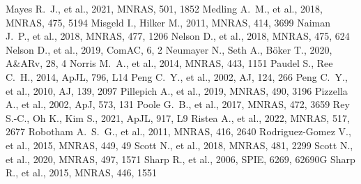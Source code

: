 \documentclass[a4paper,fleqn,usenatbib]{mnras}
\begin{document}
\begin{thebibliography}{99}
 Mayes R.~J., et al., 2021, MNRAS, 501, 1852
 Medling A.~M., et al., 2018, MNRAS, 475, 5194
 Misgeld I., Hilker M., 2011, MNRAS, 414, 3699
 Naiman J.~P., et al., 2018, MNRAS, 477, 1206
 Nelson D., et al., 2018, MNRAS, 475, 624
 Nelson D., et al., 2019, ComAC, 6, 2
 Neumayer N., Seth A., B{\"o}ker T., 2020, A\&ARv, 28, 4
 Norris M.~A., et al., 2014, MNRAS, 443, 1151
 Paudel S., Ree C.~H., 2014, ApJL, 796, L14
 Peng C.~Y., et al., 2002, AJ, 124, 266
   Peng C.~Y., et al., 2010, AJ, 139, 2097
 Pillepich A., et al., 2019, MNRAS, 490, 3196
 Pizzella A., et al., 2002, ApJ, 573, 131
 Poole G.~B., et al., 2017, MNRAS, 472, 3659
 Rey S.-C., Oh K., Kim S., 2021, ApJL, 917, L9
 Ristea A., et al., 2022, MNRAS, 517, 2677
  Robotham A.~S.~G., et al., 2011, MNRAS, 416, 2640 
 Rodriguez-Gomez V., et al., 2015, MNRAS, 449, 49
 Scott N., et al., 2018, MNRAS, 481, 2299
 Scott N., et al., 2020, MNRAS, 497, 1571
 Sharp R., et al., 2006, SPIE, 6269, 62690G 
 Sharp R., et al., 2015, MNRAS, 446, 1551 

\end{thebibliography}
\end{document}
